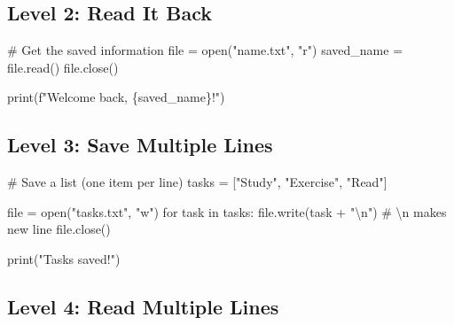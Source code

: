 \documentclass[
  letterpaper,
  DIV=11,
  numbers=noendperiod,
  oneside]{scrreprt}
\newenvironment{Shaded}{}{}
\newcommand{\BuiltInTok}[1]{\textcolor[rgb]{0.84,0.23,0.29}{#1}}
\newcommand{\CharTok}[1]{\textcolor[rgb]{0.01,0.18,0.38}{#1}}
\newcommand{\CommentTok}[1]{\textcolor[rgb]{0.42,0.45,0.49}{#1}}
\newcommand{\ControlFlowTok}[1]{\textcolor[rgb]{0.84,0.23,0.29}{#1}}
\newcommand{\KeywordTok}[1]{\textcolor[rgb]{0.84,0.23,0.29}{#1}}
\newcommand{\NormalTok}[1]{\textcolor[rgb]{0.14,0.16,0.18}{#1}}
\newcommand{\OperatorTok}[1]{\textcolor[rgb]{0.14,0.16,0.18}{#1}}
\newcommand{\SpecialCharTok}[1]{\textcolor[rgb]{0.00,0.36,0.77}{#1}}
\newcommand{\SpecialStringTok}[1]{\textcolor[rgb]{0.01,0.18,0.38}{#1}}
\newcommand{\StringTok}[1]{\textcolor[rgb]{0.01,0.18,0.38}{#1}}
\begin{document}
\subsection{Level 2: Read It Back}\label{level-2-read-it-back}

\begin{Shaded}
\begin{Highlighting}[]
\CommentTok{\# Get the saved information}
\BuiltInTok{file} \OperatorTok{=} \BuiltInTok{open}\NormalTok{(}\StringTok{"name.txt"}\NormalTok{, }\StringTok{"r"}\NormalTok{)}
\NormalTok{saved\_name }\OperatorTok{=} \BuiltInTok{file}\NormalTok{.read()}
\BuiltInTok{file}\NormalTok{.close()}

\BuiltInTok{print}\NormalTok{(}\SpecialStringTok{f"Welcome back, }\SpecialCharTok{\{}\NormalTok{saved\_name}\SpecialCharTok{\}}\SpecialStringTok{!"}\NormalTok{)}
\end{Highlighting}
\end{Shaded}

\subsection{Level 3: Save Multiple
Lines}\label{level-3-save-multiple-lines}

\begin{Shaded}
\begin{Highlighting}[]
\CommentTok{\# Save a list (one item per line)}
\NormalTok{tasks }\OperatorTok{=}\NormalTok{ [}\StringTok{"Study"}\NormalTok{, }\StringTok{"Exercise"}\NormalTok{, }\StringTok{"Read"}\NormalTok{]}

\BuiltInTok{file} \OperatorTok{=} \BuiltInTok{open}\NormalTok{(}\StringTok{"tasks.txt"}\NormalTok{, }\StringTok{"w"}\NormalTok{)}
\ControlFlowTok{for}\NormalTok{ task }\KeywordTok{in}\NormalTok{ tasks:}
    \BuiltInTok{file}\NormalTok{.write(task }\OperatorTok{+} \StringTok{"}\CharTok{\textbackslash{}n}\StringTok{"}\NormalTok{)  }\CommentTok{\# \textbackslash{}n makes new line}
\BuiltInTok{file}\NormalTok{.close()}

\BuiltInTok{print}\NormalTok{(}\StringTok{"Tasks saved!"}\NormalTok{)}
\end{Highlighting}
\end{Shaded}

\subsection{Level 4: Read Multiple
Lines}\label{level-4-read-multiple-lines}
\end{document}
